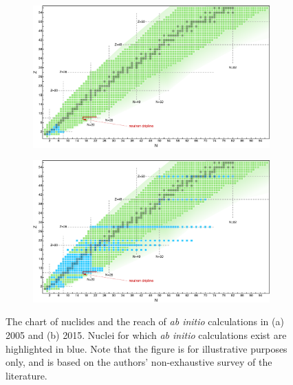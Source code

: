 \begin{figure}[t!]
\centering
   \begin{subfigure}[t]{.5\textwidth}
   \centering
  \includegraphics[width=.99\linewidth]{ab-initio_nuclear_chart_2005.eps}
   \caption{   \label{fig:abinitio2005} }
\end{subfigure}%
\begin{subfigure}[t]{.5\textwidth}
\centering
  \includegraphics[width=.99\linewidth]{ab-initio_nuclear_chart_2015.eps}
   \caption{\label{fig:abinitio2015}}
\end{subfigure}
\caption{\label{fig:abinitio}The chart of nuclides and the reach of \emph{ab initio} calculations in (a) 2005 and (b) 2015. Nuclei for which \emph{ab initio} calculations exist are highlighted in blue. Note that the figure is for illustrative purposes only, and is based on the authors' non-exhaustive survey of the literature.}
\end{figure}

